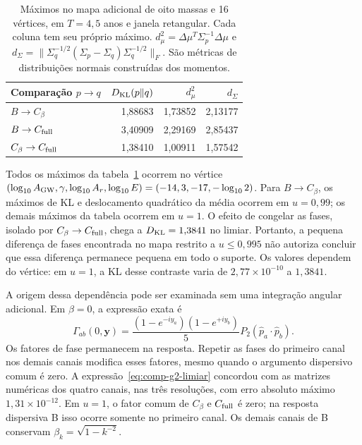 \begin{table}[htbp]
\centering
\caption{Máximos no mapa adicional de oito massas e 16 vértices, em
$T=4{,}5$ anos e janela retangular. Cada coluna tem seu próprio máximo.
$d_\mu^2=\Delta\mu^T\Sigma_p^{-1}\Delta\mu$ e
$d_\Sigma=\|\Sigma_q^{-1/2}(\Sigma_p-\Sigma_q)\Sigma_q^{-1/2}\|_F$.
São métricas de distribuições normais construídas dos momentos.}
\label{tab:comp-g2-maximos}
\begin{tabular}{lrrr}
\toprule
Comparação $p\to q$ & $D_{\rm KL}(p\Vert q)$ & $d_\mu^2$ & $d_\Sigma$ \\
\midrule
$B\to C_\beta$ & 1,88683 & 1,73852 & 2,13177 \\
$B\to C_{\rm full}$ & 3,40909 & 2,29169 & 2,85437 \\
$C_\beta\to C_{\rm full}$ & 1,38410 & 1,00911 & 1,57542 \\
\bottomrule
\end{tabular}
\end{table}

Todos os máximos da tabela~\ref{tab:comp-g2-maximos} ocorrem no vértice
$(\log_{10}A_{\rm GW},\gamma,\log_{10}A_r,\log_{10}E)
=(-14,3,-17,-\log_{10}2)$.
Para $B\to C_\beta$, os máximos de KL e deslocamento quadrático da média
ocorrem em $u=0{,}99$; os demais máximos da tabela ocorrem em $u=1$.
O efeito de congelar as fases, isolado por $C_\beta\to C_{\rm full}$,
chega a $D_{\rm KL}=1{,}3841$ no limiar. Portanto, a pequena diferença
de fases encontrada no mapa restrito a $u\leq0{,}995$ não autoriza
concluir que essa diferença permanece pequena em todo o suporte.
Os valores dependem do vértice: em $u=1$, a KL desse contraste varia
de $2{,}77\times10^{-10}$ a $1{,}3841$.

A origem dessa dependência pode ser examinada sem uma integração angular
adicional. Em $\beta=0$, a expressão exata é
\begin{equation}
 \Gamma_{ab}(0,\boldsymbol y)
 =\frac{(1-e^{-iy_a})(1-e^{+iy_b})}{5}
 P_2(\hat p_a\cdot\hat p_b).
 \label{eq:comp-g2-limiar}
\end{equation}
Os fatores de fase permanecem na resposta. Repetir as fases do primeiro
canal nos demais canais modifica esses fatores, mesmo quando o argumento
dispersivo comum é zero. A expressão~\eqref{eq:comp-g2-limiar} concordou
com as matrizes numéricas dos quatro canais, nas três resoluções, com erro
absoluto máximo $1{,}31\times10^{-12}$.
Em $u=1$, o fator comum de $C_\beta$ e $C_{\rm full}$ é zero;
na resposta dispersiva B isso ocorre somente no primeiro canal.
Os demais canais de B conservam $\beta_k=\sqrt{1-k^{-2}}$.

